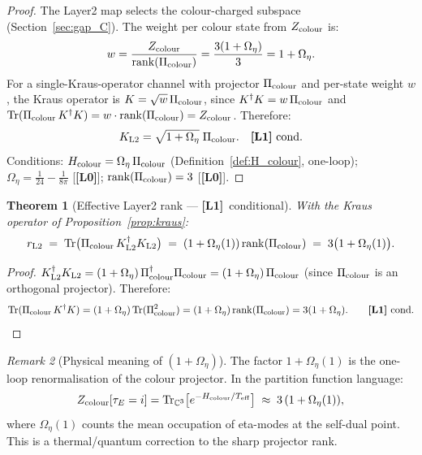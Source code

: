 \documentclass[12pt,a4paper]{article}
\newtheorem{theorem}{Theorem}[section]
\theoremstyle{definition}\newtheorem{definition}[theorem]{Definition}
\theoremstyle{remark}\newtheorem{remark}[theorem]{Remark}
\newcommand{\Lz}{\textbf{[L0]}}
\newcommand{\Lo}{\textbf{[L1]}}
\newcommand{\CC}{\mathbb{C}}
\begin{document}
\begin{proof}
The Layer2 map selects the colour-charged subspace (Section~\ref{sec:gap_C}).
The weight per colour state from $Z_{\rm colour}$ is:
\[
  w = \frac{Z_{\rm colour}}{\mathrm{rank}(\Pi_{\rm colour})}
  = \frac{3(1+\Omega_\eta)}{3} = 1+\Omega_\eta.
\]
For a single-Kraus-operator channel with projector $\Pi_{\rm colour}$
and per-state weight $w$, the Kraus operator is $K = \sqrt{w}\,\Pi_{\rm colour}$,
since $K^\dagger K = w\,\Pi_{\rm colour}$ and
$\mathrm{Tr}(\Pi_{\rm colour}\,K^\dagger K) = w\cdot\mathrm{rank}(\Pi_{\rm colour}) = Z_{\rm colour}$.
Therefore:
\[
  K_{\rm L2} = \sqrt{1+\Omega_\eta}\;\Pi_{\rm colour}.
  \quad \Lo\ \text{cond.}
\]
Conditions: $H_{\rm colour} = \Omega_\eta\,\Pi_{\rm colour}$
(Definition~\ref{def:H_colour}, one-loop); $\Omega_\eta = \tfrac{1}{24}-\tfrac{1}{8\pi}$
[\Lz]; $\mathrm{rank}(\Pi_{\rm colour})=3$ [\Lz].
\end{proof}

\begin{theorem}[Effective Layer2 rank — \Lo\ conditional]
\label{thm:rL2}
With the Kraus operator of Proposition~\ref{prop:kraus}:
\[
  r_{\rm L2}
  \;=\;
  \mathrm{Tr}\bigl(\Pi_{\rm colour}\,
  K_{\rm L2}^\dagger K_{\rm L2}\bigr)
  \;=\;
  (1+\Omega_\eta(1))\,\mathrm{rank}(\Pi_{\rm colour})
  \;=\;
  3\bigl(1+\Omega_\eta(1)\bigr).
\]
\end{theorem}

\begin{proof}
$K_{\rm L2}^\dagger K_{\rm L2}
= (1+\Omega_\eta)\,\Pi_{\rm colour}^\dagger\Pi_{\rm colour}
= (1+\Omega_\eta)\,\Pi_{\rm colour}$
(since $\Pi_{\rm colour}$ is an orthogonal projector).
Therefore:
\[
  \mathrm{Tr}(\Pi_{\rm colour}\,K^\dagger K)
  = (1+\Omega_\eta)\,\mathrm{Tr}(\Pi_{\rm colour}^2)
  = (1+\Omega_\eta)\,\mathrm{rank}(\Pi_{\rm colour})
  = 3(1+\Omega_\eta). \qquad \Lo\ \text{cond.}
\]
\end{proof}

\begin{remark}[Physical meaning of $(1+\Omega_\eta)$]
The factor $1+\Omega_\eta(1)$ is the one-loop renormalisation
of the colour projector. In the partition function language:
\[
  Z_{\rm colour}[\tau_E=i]
  = \mathrm{Tr}_{\CC^3}\bigl[e^{-H_{\rm colour}/T_{\rm eff}}\bigr]
  \;\approx\; 3\,(1+\Omega_\eta(1)),
\]
where $\Omega_\eta(1)$ counts the mean occupation of eta-modes
at the self-dual point. This is a thermal/quantum correction to
the sharp projector rank.
\end{remark}
\end{document}
